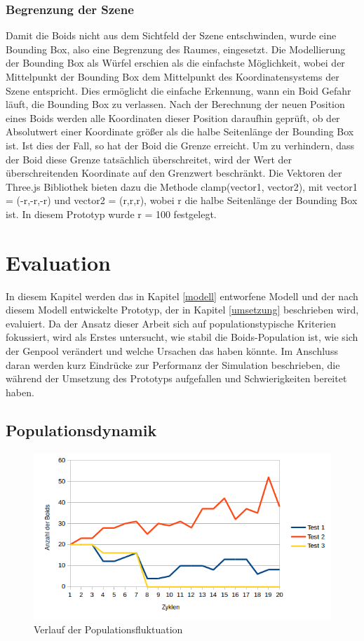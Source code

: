 \documentclass[draft=false
              ,paper=a4
              ,twoside=false
              ,fontsize=11pt
              ,headsepline
              ,BCOR10mm
              ,DIV11
              ,bibtotoc
              ,liststotoc
              ]{scrbook}
\begin{document}
\subsection{Begrenzung der Szene}\label{box}
Damit die Boids nicht aus dem Sichtfeld der Szene entschwinden, wurde eine Bounding Box, also eine Begrenzung des Raumes, eingesetzt. Die Modellierung der Bounding Box als Würfel erschien als die einfachste Möglichkeit, wobei der Mittelpunkt der Bounding Box dem Mittelpunkt des Koordinatensystems der Szene entspricht. Dies ermöglicht die einfache Erkennung, wann ein Boid Gefahr läuft, die Bounding Box zu verlassen. Nach der Berechnung der neuen Position eines Boids werden alle Koordinaten dieser Position daraufhin geprüft, ob der Absolutwert einer Koordinate größer als die halbe Seitenlänge der Bounding Box ist. Ist dies der Fall, so hat der Boid die Grenze erreicht. Um zu verhindern, dass der Boid diese Grenze tatsächlich überschreitet, wird der Wert der überschreitenden Koordinate auf den Grenzwert beschränkt. Die Vektoren der Three.js Bibliothek bieten dazu die Methode clamp(vector1, vector2), mit vector1 = (-r,-r,-r) und vector2 = (r,r,r), wobei r die halbe Seitenlänge der Bounding Box ist. In diesem Prototyp wurde r = 100 festgelegt.

\chapter{Evaluation}\label{eval}
In diesem Kapitel werden das in Kapitel \ref{modell} entworfene Modell und der nach diesem Modell entwickelte Prototyp, der in Kapitel \ref{umsetzung} beschrieben wird, evaluiert. Da der Ansatz dieser Arbeit sich auf populationstypische Kriterien fokussiert, wird als Erstes untersucht, wie stabil die Boids-Population ist, wie sich der Genpool verändert und welche Ursachen das haben könnte. Im Anschluss daran werden kurz Eindrücke zur Performanz der Simulation beschrieben, die während der Umsetzung des Prototyps aufgefallen und Schwierigkeiten bereitet haben.

\section{Populationsdynamik}
\begin{figure}[h]
\centering
\includegraphics[scale=0.8]{project/Test1-Populationen.png}
\caption{Verlauf der Populationsfluktuation}
\label{populationsgrafik}
\end{figure}
\end{document}
